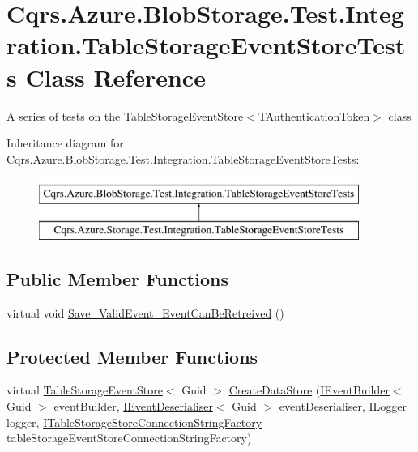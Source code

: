 \hypertarget{classCqrs_1_1Azure_1_1BlobStorage_1_1Test_1_1Integration_1_1TableStorageEventStoreTests}{}\section{Cqrs.\+Azure.\+Blob\+Storage.\+Test.\+Integration.\+Table\+Storage\+Event\+Store\+Tests Class Reference}
\label{classCqrs_1_1Azure_1_1BlobStorage_1_1Test_1_1Integration_1_1TableStorageEventStoreTests}


A series of tests on the Table\+Storage\+Event\+Store$<$\+T\+Authentication\+Token$>$ class  


Inheritance diagram for Cqrs.\+Azure.\+Blob\+Storage.\+Test.\+Integration.\+Table\+Storage\+Event\+Store\+Tests\+:\begin{figure}[H]
\begin{center}
\leavevmode
\includegraphics[height=2.000000cm]{classCqrs_1_1Azure_1_1BlobStorage_1_1Test_1_1Integration_1_1TableStorageEventStoreTests}
\end{center}
\end{figure}
\subsection*{Public Member Functions}
\begin{DoxyCompactItemize}
\item 
virtual void \hyperlink{classCqrs_1_1Azure_1_1BlobStorage_1_1Test_1_1Integration_1_1TableStorageEventStoreTests_a0f88e64f7ff8f84b308d4a8c78222b7e}{Save\+\_\+\+Valid\+Event\+\_\+\+Event\+Can\+Be\+Retreived} ()
\end{DoxyCompactItemize}
\subsection*{Protected Member Functions}
\begin{DoxyCompactItemize}
\item 
virtual \hyperlink{classCqrs_1_1Azure_1_1BlobStorage_1_1Events_1_1TableStorageEventStore}{Table\+Storage\+Event\+Store}$<$ Guid $>$ \hyperlink{classCqrs_1_1Azure_1_1BlobStorage_1_1Test_1_1Integration_1_1TableStorageEventStoreTests_aa2b40be10577126372049c14fd951e17}{Create\+Data\+Store} (\hyperlink{interfaceCqrs_1_1Events_1_1IEventBuilder}{I\+Event\+Builder}$<$ Guid $>$ event\+Builder, \hyperlink{interfaceCqrs_1_1Events_1_1IEventDeserialiser}{I\+Event\+Deserialiser}$<$ Guid $>$ event\+Deserialiser, I\+Logger logger, \hyperlink{interfaceCqrs_1_1Azure_1_1BlobStorage_1_1ITableStorageStoreConnectionStringFactory}{I\+Table\+Storage\+Store\+Connection\+String\+Factory} table\+Storage\+Event\+Store\+Connection\+String\+Factory)
\end{DoxyCompactItemize}


